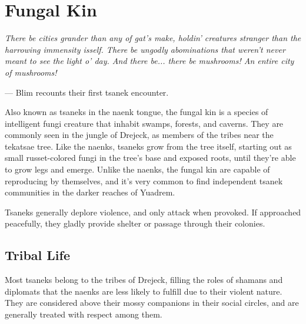 
\section{Fungal Kin}
\begin{linenumbers}
\textit{There be cities grander than any of gat's make, holdin' creatures stranger than the harrowing immensity isself.
There be ungodly abominations that weren't never meant to see the light o' day.
And there be... there be mushrooms! An entire city of mushrooms!}

\hspace*{\fill} --- Blim recounts their first tsanek encounter.




Also known as tsaneks in the naenk tongue, the fungal kin is a species of intelligent fungi creature that inhabit swamps, forests, and caverns.
They are commonly seen in the jungle of Drejeck, as members of the tribes near the tekatsae tree.
Like the naenks, tsaneks grow from the tree itself, starting out as small russet-colored fungi in the tree's base and exposed roots, until they're able to grow legs and emerge.
Unlike the naenks, the fungal kin are capable of reproducing by themselves, and it's very common to find independent tsanek communities in the darker reaches of Yuadrem.

Tsaneks generally deplore violence, and only attack when provoked.
If approached peacefully, they gladly provide shelter or passage through their colonies.

\subsection*{Tribal Life}
Most tsaneks belong to the tribes of Drejeck, filling the roles of shamans and diplomats that the naenks are less likely to fulfill due to their violent nature.
They are considered above their mossy companions in their social circles, and are generally treated with respect among them.


\end{linenumbers}

